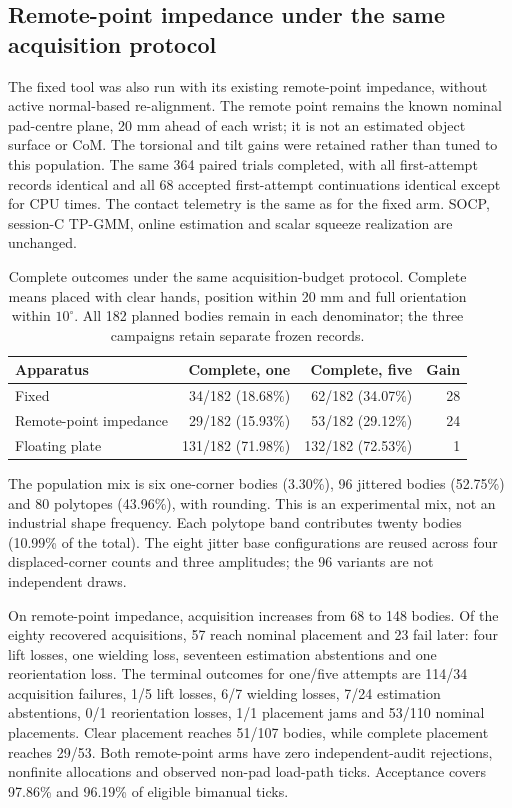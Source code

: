\subsection{Remote-point impedance under the same acquisition protocol}

The fixed tool was also run with its existing remote-point impedance, without active normal-based re-alignment. The remote point remains the known nominal pad-centre plane, 20 mm ahead of each wrist; it is not an estimated object surface or CoM. The torsional and tilt gains were retained rather than tuned to this population. The same 364 paired trials completed, with all first-attempt records identical and all 68 accepted first-attempt continuations identical except for CPU times. The contact telemetry is the same as for the fixed arm. SOCP, session-C TP-GMM, online estimation and scalar squeeze realization are unchanged.

\begin{table}[htbp]\centering\small
\begin{tabular}{@{}lrrr@{}}\toprule
Apparatus & Complete, one & Complete, five & Gain\\
\midrule
Fixed & 34/182 (18.68\%) & 62/182 (34.07\%) & 28\\
Remote-point impedance & 29/182 (15.93\%) & 53/182 (29.12\%) & 24\\
Floating plate & 131/182 (71.98\%) & 132/182 (72.53\%) & 1\\
\bottomrule\end{tabular}
\caption{Complete outcomes under the same acquisition-budget protocol. Complete means placed with clear hands, position within 20 mm and full orientation within $10^\circ$. All 182 planned bodies remain in each denominator; the three campaigns retain separate frozen records.}
\label{tab:three-acquisition-budgets}
\end{table}

The population mix is six one-corner bodies (3.30\%), 96 jittered bodies (52.75\%) and 80 polytopes (43.96\%), with rounding. This is an experimental mix, not an industrial shape frequency. Each polytope band contributes twenty bodies (10.99\% of the total). The eight jitter base configurations are reused across four displaced-corner counts and three amplitudes; the 96 variants are not independent draws.

On remote-point impedance, acquisition increases from 68 to 148 bodies. Of the eighty recovered acquisitions, 57 reach nominal placement and 23 fail later: four lift losses, one wielding loss, seventeen estimation abstentions and one reorientation loss. The terminal outcomes for one/five attempts are 114/34 acquisition failures, 1/5 lift losses, 6/7 wielding losses, 7/24 estimation abstentions, 0/1 reorientation losses, 1/1 placement jams and 53/110 nominal placements. Clear placement reaches 51/107 bodies, while complete placement reaches 29/53. Both remote-point arms have zero independent-audit rejections, nonfinite allocations and observed non-pad load-path ticks. Acceptance covers 97.86\% and 96.19\% of eligible bimanual ticks.

